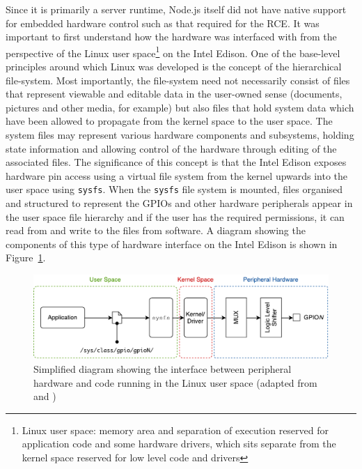       Since it is primarily a server runtime, Node.js itself did not have native support for embedded hardware control such as that required for the RCE. It was important to first understand how the hardware was interfaced with from the perspective of the Linux user space\footnote{Linux user space: memory area and separation of execution reserved for application code and some hardware drivers, which sits separate from the kernel space reserved for low level code and drivers} on the Intel Edison. One of the base-level principles around which Linux was developed is the concept of the hierarchical file-system. Most importantly, the file-system need not necessarily consist of files that represent viewable and editable data in the user-owned sense (documents, pictures and other media, for example) but also files that hold system data which have been allowed to propagate from the kernel space to the user space. The system files may represent various hardware components and subsystems, holding state information and allowing control of the hardware through editing of the associated files. The significance of this concept is that the Intel Edison exposes hardware pin access using a virtual file system from the kernel upwards into the user space using \texttt{sysfs}. When the \texttt{sysfs} file system is mounted, files organised and structured to represent the GPIOs and other hardware peripherals appear in the user space file hierarchy and if the user has the required permissions, it can read from and write to the files from software. A diagram showing the components of this type of hardware interface on the Intel Edison is shown in Figure~\ref{fig:softDesign-sysfsExample}.
      
      \begin{figure}[h!]
        \centering
        \includegraphics[width=0.8\linewidth]{figures/softDesign-sysfsExample}
        \caption[Simplified diagram showing the interface between peripheral hardware and code running in the Linux user space]{Simplified diagram showing the interface between peripheral hardware and code running in the Linux user space (adapted from \cite{fig:softDesign-sysfsExample_cite1} and \cite{fig:softDesign-sysfsExample_cite2})}
        \label{fig:softDesign-sysfsExample}
      \end{figure}
      
